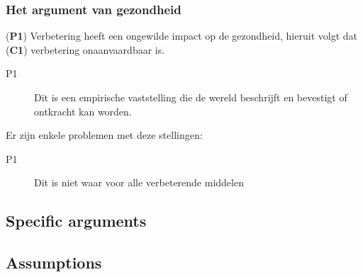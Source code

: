 \documentclass[../summary.tex]{subfiles}
\begin{document}
			\subsubsection{Het argument van gezondheid}
				(\textbf{P1}) Verbetering heeft een ongewilde impact op de gezondheid, hieruit volgt dat (\textbf{C1}) verbetering onaanvaardbaar is. 
				\begin{description}
					\item[P1] Dit is een empirische vaststelling die de wereld beschrijft en bevestigt of ontkracht kan worden. 
				\end{description}
				Er zijn enkele problemen met deze stellingen:
				\begin{description}
					\item[P1] Dit is niet waar voor alle verbeterende middelen
				\end{description} 
		\subsection{Specific arguments}
		\subsection{Assumptions}
		
\end{document}
